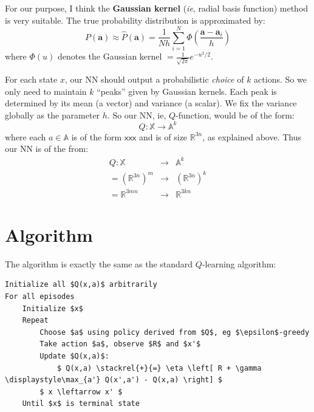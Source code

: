 \documentclass[orivec]{llncs}
\newcommand{\vect}[1]{\boldsymbol{#1}}
\begin{document}
For our purpose, I think the \textbf{Gaussian kernel} (\textit{ie}, radial basis function) method is very suitable.  The true probability distribution is approximated by:
\begin{equation}
P(\vect{a}) \approx \hat{P}(\vect{a}) = \frac{1}{N h} \sum_{i = 1}^{N} \Phi \left( \frac{\vect{a} - \vect{a}_i}{h} \right)
\end{equation}
where $\Phi(u)$ denotes the Gaussian kernel $= \frac{1}{\sqrt{2 \pi}} e^{- u^2 / 2}$.

For each state $x$, our NN should output a probabilistic \textit{choice} of $k$ actions.  So we only need to maintain $k$ ``peaks'' given by Gaussian kernels.  Each peak is determined by its mean (a vector) and variance (a scalar).  We fix the variance globally as the parameter $h$.  So our NN, ie, $Q$-function, would be of the form:
\begin{equation}
Q: \mathbb{X} \rightarrow \mathbb{A}^k
\end{equation}
where each $a \in \mathbb{A}$ is of the form $\mathsf{xxx}$ and is of size $\mathbb{R}^{3n}$, as explained above.  Thus our NN is of the from:
\begin{eqnarray}
Q: \mathbb{X} &\rightarrow& \mathbb{A}^k \nonumber \\
= (\mathbb{R}^{3n})^m &\rightarrow& (\mathbb{R}^{3n})^k \nonumber \\
= \mathbb{R}^{3mn} &\rightarrow& \mathbb{R}^{3kn} 
\end{eqnarray}

\section{Algorithm}

The algorithm is exactly the same as the standard $Q$-learning algorithm:

\begin{tcolorbox}[colback=grey, breakable, enhanced]
\begin{lstlisting}
Initialize all $Q(x,a)$ arbitrarily
For all episodes
    Initialize $x$
    Repeat
        Choose $a$ using policy derived from $Q$, eg $\epsilon$-greedy
        Take action $a$, observe $R$ and $x'$
        Update $Q(x,a)$:
            $ Q(x,a) \stackrel{+}{=} \eta \left[ R + \gamma \displaystyle\max_{a'} Q(x',a') - Q(x,a) \right] $
        $ x \leftarrow x' $
    Until $x$ is terminal state
\end{lstlisting}
\end{tcolorbox}
\end{document}
